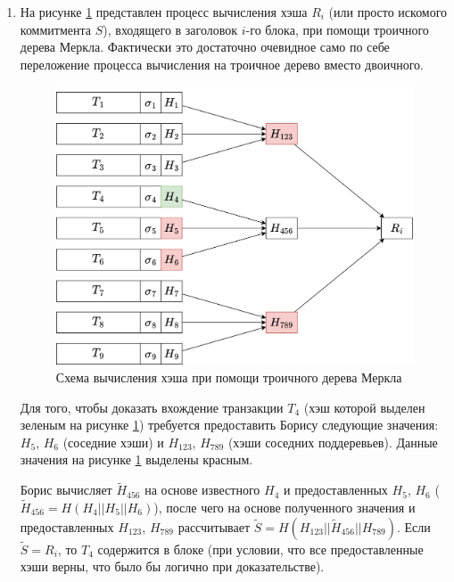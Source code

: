 \documentclass[12pt, a4paper]{extarticle}
\begin{document}
\begin{enumerate}
    \item На рисунке \ref{fig:2.1} представлен процесс вычисления хэша $R_i$ (или просто искомого
        коммитмента $S$), входящего в заголовок $i$-го блока, при помощи троичного дерева Меркла. 
        Фактически это достаточно очевидное само по себе переложение процесса вычисления на 
        троичное дерево вместо двоичного.
        \begin{figure}[h!]
            \centering
            \includegraphics[width=\textwidth]{2.1.png}
            \caption{Схема вычисления хэша при помощи троичного дерева Меркла}
            \label{fig:2.1}
        \end{figure}
        
        Для того, чтобы доказать вхождение транзакции $T_4$ (хэш которой выделен зеленым на рисунке
        \ref{fig:2.1}) требуется предоставить Борису следующие значения: $H_5$, $H_6$ (соседние
        хэши) и $H_{123}$, $H_{789}$ (хэши соседних поддеревьев). Данные значения на рисунке
        \ref{fig:2.1} выделены красным.
        
        Борис вычисляет $\tilde{H}_{456}$ на основе известного $H_4$ и предоставленных $H_5$, $H_6$
        ($\tilde{H}_{456} = H(H_4 || H_5 || H_6)$), после чего на основе полученного значения и
        предоставленных $H_{123}$, $H_{789}$ рассчитывает $\tilde{S} = H(H_{123} || \tilde{H}_{456}
        || H_{789})$. Если $\tilde{S} = R_i$, то $T_4$ содержится в блоке (при условии, что все 
        предоставленные хэши верны, что было бы логично при доказательстве).
        

\end{enumerate}
\end{document}
